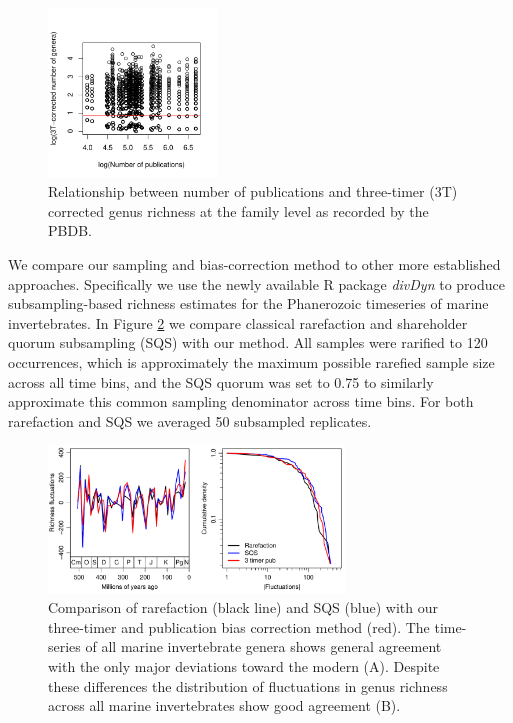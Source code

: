 \documentclass[12pt]{article}
\let\citep=\cite
\begin{document}
\begin{figure}[!hp]
  \centering
  \includegraphics[width=0.4\textwidth]{../../figSupp_divByPub.pdf}
  \caption{Relationship between number of publications and three-timer
    (3T) corrected genus richness at the family level as recorded by
    the PBDB.}
  \label{figSupp:divByPub}
\end{figure}


We compare our sampling and bias-correction method to other more
established approaches. Specifically we use the newly available R
package {\it divDyn} \citep{kocsis2018} to produce subsampling-based
richness estimates for the Phanerozoic timeseries of marine
invertebrates. In Figure \ref{figSupp:3TPub} we compare classical
rarefaction and shareholder quorum subsampling (SQS) with our
method. All samples were rarified to 120 occurrences, which is
approximately the maximum possible rarefied sample size across all
time bins, and the SQS quorum was set to 0.75 to similarly approximate
this common sampling denominator across time bins. For both
rarefaction and SQS we averaged 50 subsampled replicates.

  
\begin{figure}[!hp]
  \centering
  \includegraphics[width=0.7\textwidth]{../../figSupp_divEstComp.pdf}
  \caption{Comparison of rarefaction (black line) and SQS (blue)
    with our three-timer and publication bias correction method
    (red). The time-series of all marine invertebrate genera shows
    general agreement with the only major deviations toward the modern
    (A). Despite these differences the distribution of fluctuations in
    genus richness across all marine invertebrates show good agreement
    (B).}
  \label{figSupp:3TPub}
\end{figure}
\end{document}
